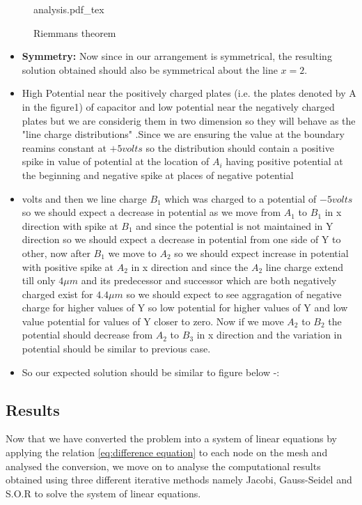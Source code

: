 \begin{figure}[h]
    \centering
    \def\svgwidth{0.6\textwidth}
    {analysis.pdf_tex}
    \caption{Riemmans theorem}
    \label{fig:riemmans-theorem}
\end{figure}
\begin{itemize}
    \item \textbf{Symmetry: } Now since in our arrangement is symmetrical, the resulting solution obtained should also be symmetrical about the line $x = 2$. 
    \item High Potential near the positively charged plates (i.e. the plates denoted by A  in the figure1) of capacitor and low potential near the negatively charged plates but we are considerig them in two dimension so they will behave as the "line charge distributions" .Since we are ensuring the value at the boundary reamins constant at $ +5 volts $ so the distribution should contain a positive spike in value of potential at the location of $A_i$  having positive potential at the beginning and negative spike at places of negative potential
    \item   volts and then we line charge $ B_1$ which was charged to a potential of $ -5 volts $ so we should expect a decrease in potential as we move from $ A_1 $ to $ B_1 $ in x direction with spike at $ B_1 $ and since the potential is not maintained in Y direction so we should expect a decrease in potential from one side of Y to other, now after $ B_1 $ we move to $ A_2 $ so we should expect increase in potential with positive spike at $ A_2 $ in x direction and since the $ A_2 $ line charge extend till only $ 4 \mu m $ and its predecessor and successor which are both negatively charged exist for $ 4.4 \mu m $ so we should expect to see aggragation of negative charge for higher values of Y so low potential for higher values of Y and low value potential for values of Y closer to zero. Now if we move $ A_2 $ to $ B_2 $ the potential should decrease from $ A_2 $ to $ B_3 $ in x direction and the variation in potential should be similar to previous case.
    \item So our expected solution should be similar to figure below -:     
\end{itemize}

\subsection{Results}
Now that we have converted the problem into a system of linear equations by applying the relation \ref{eq:difference equation} to each node on the mesh and analysed the conversion, we move on to analyse the computational results obtained using three different iterative methods namely Jacobi, Gauss-Seidel and S.O.R to solve the system of linear equations.


